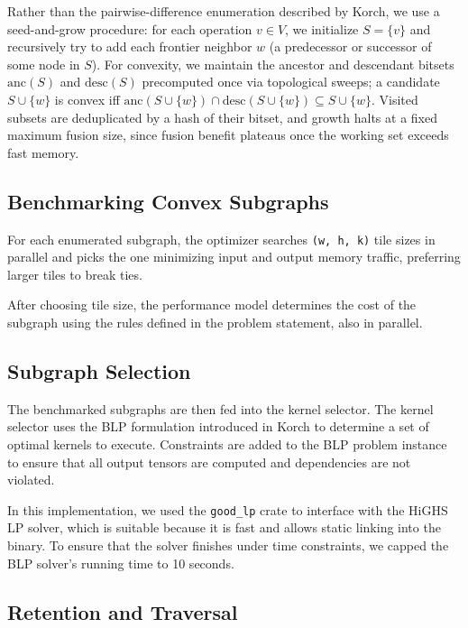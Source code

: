 \documentclass[10pt,letterpaper]{article}
\begin{document}
Rather than the pairwise-difference enumeration described by Korch, we use a seed-and-grow procedure: for each operation $v \in V$, we initialize $S = \{v\}$ and recursively try to add each frontier neighbor $w$ (a predecessor or successor of some node in $S$). For convexity, we maintain the ancestor and descendant bitsets $\mathrm{anc}(S)$ and $\mathrm{desc}(S)$ precomputed once via topological sweeps; a candidate $S \cup \{w\}$ is convex iff $\mathrm{anc}(S \cup \{w\}) \cap \mathrm{desc}(S \cup \{w\}) \subseteq S \cup \{w\}$. Visited subsets are deduplicated by a hash of their bitset, and growth halts at a fixed maximum fusion size, since fusion benefit plateaus once the working set exceeds fast memory.

\subsection{Benchmarking Convex Subgraphs}

For each enumerated subgraph, the optimizer searches \texttt{(w, h, k)} tile sizes in parallel and picks the one minimizing input and output memory traffic, preferring larger tiles to break ties.

After choosing tile size, the performance model determines the cost of the subgraph using the rules defined in the problem statement, also in parallel.

\subsection{Subgraph Selection}

The benchmarked subgraphs are then fed into the kernel selector. The kernel selector uses the BLP formulation introduced in Korch\cite{korch2024} to determine a set of optimal kernels to execute. Constraints are added to the BLP problem instance to ensure that all output tensors are computed and dependencies are not violated.

In this implementation, we used the \texttt{good\_lp} crate to interface with the HiGHS LP solver, which is suitable because it is fast and allows static linking into the binary. To ensure that the solver finishes under time constraints, we capped the BLP solver's running time to 10 seconds.

\subsection{Retention and Traversal}
\end{document}

